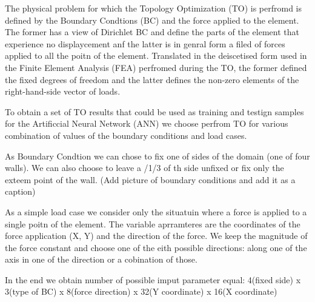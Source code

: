 
The physical problem for which the Topology Optimization (TO) is perfromd is defined by the Boundary Condtions (BC) and the force applied to the element. 
The former has a view of Dirichlet BC and define the parts of the element that experience no displaycement anf the latter is in genral form a filed of forces applied to all the poitn of the element. 
Translated in the deiscetised form used in the Finite Element Analysis (FEA) perfromed during the TO, the former defined the fixed degrees of freedom and the latter defines the non-zero elements of the right-hand-side vector of loads.

To obtain a set of TO results that could be used as training and testign samples for the Artificcial Neural Network (ANN) we choose perfrom TO for various combination of values of the boundary conditions and load cases.

As Boundary Condtion we can chose to fix one of sides of the domain (one of four walls). 
We can also choose to leave a /{1/3} of th side unfixed or fix only the exteem point of the wall. (Add picture of boundary conditions and add it as a caption)

As a simple load case we consider only the situatuin where a force is applied to a single poitn of the element. 
The variable aprramteres are the coordinates of the force application (X, Y) and the direction of the force.
We keep the magnitude of the force constant and choose one of the eith possible directions: along one of the axis in one of the direction or a cobination of those.

In the end we obtain number of possible imput parameter equal: 4(fixed side) x 3(type of BC) x 8(force direction) x 32(Y coordinate) x 16(X coordinate)


 

